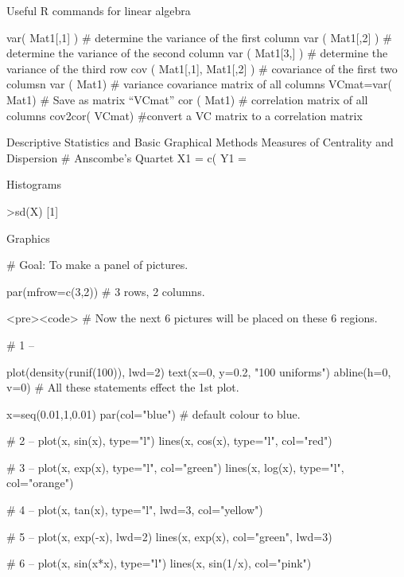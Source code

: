 
Useful R commands for linear algebra

 
 
var( Mat1[,1] )                                          # determine the variance of the first column
var ( Mat1[,2] )                                          # determine the variance of the second column
var ( Mat1[3,] )                                          # determine the variance of the third row
cov ( Mat1[,1], Mat1[,2] )              # covariance of the first two columsn
var ( Mat1)                                          # variance covariance matrix of all columns
VCmat=var( Mat1)                            # Save as matrix “VCmat”
cor ( Mat1)                                          # correlation matrix of all columns
cov2cor( VCmat)                            #convert a VC matrix to a correlation matrix
 
Descriptive Statistics and Basic Graphical Methods
Measures of Centrality and Dispersion
# Anscombe’s  Quartet
X1 = c(
Y1 =

Histograms
 
>sd(X)
[1]
 
 
 




Graphics

# Goal: To make a panel of pictures.

par(mfrow=c(3,2))                       # 3 rows, 2 columns.

<pre><code>
# Now the next 6 pictures will be placed on these 6 regions. 

# 1 --

plot(density(runif(100)), lwd=2)
text(x=0, y=0.2, "100 uniforms")        
abline(h=0, v=0)
	          # All these statements effect the 1st plot.

x=seq(0.01,1,0.01)
par(col="blue")                        # default colour to blue.

# 2 --
plot(x, sin(x), type="l")
lines(x, cos(x), type="l", col="red")

# 3 --
plot(x, exp(x), type="l", col="green")
lines(x, log(x), type="l", col="orange")

# 4 --
plot(x, tan(x), type="l", lwd=3, col="yellow")

# 5 --
plot(x, exp(-x), lwd=2)
lines(x, exp(x), col="green", lwd=3)

# 6 --
plot(x, sin(x*x), type="l")
lines(x, sin(1/x), col="pink")


